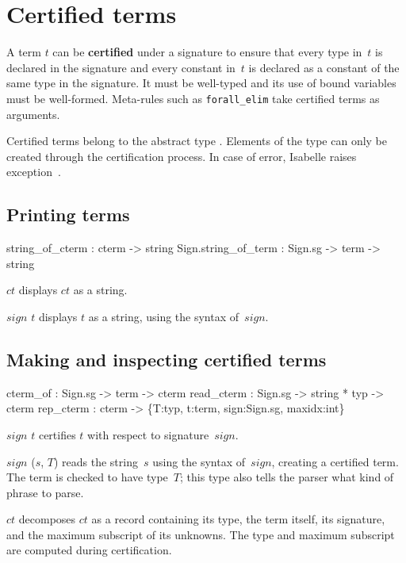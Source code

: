 \section{Certified terms} 
A term $t$ can be {\bf certified} under a signature to ensure that every
type in~$t$ is declared in the signature and every constant in~$t$ is
declared as a constant of the same type in the signature.  It must be
well-typed and its use of bound variables must be well-formed.  Meta-rules
such as {\tt forall_elim} take certified terms as arguments.

Certified terms belong to the abstract type .
Elements of the type can only be created through the certification process.
In case of error, Isabelle raises exception~\@.

\subsection{Printing terms}
\begin{ttbox} 
     string_of_cterm :           cterm -> string
Sign.string_of_term  : Sign.sg -> term -> string
\end{ttbox}
\begin{ttdescription}
\item[\ttindexbold{string_of_cterm} $ct$] 
displays $ct$ as a string.

\item[\ttindexbold{Sign.string_of_term} $sign$ $t$] 
displays $t$ as a string, using the syntax of~$sign$.
\end{ttdescription}

\subsection{Making and inspecting certified terms}
\begin{ttbox} 
cterm_of   : Sign.sg -> term -> cterm
read_cterm : Sign.sg -> string * typ -> cterm
rep_cterm  : cterm -> \{T:typ, t:term, sign:Sign.sg, maxidx:int\}
\end{ttbox}
\begin{ttdescription}
\item[\ttindexbold{cterm_of} $sign$ $t$] 
certifies $t$ with respect to signature~$sign$.

\item[\ttindexbold{read_cterm} $sign$ ($s$, $T$)] 
reads the string~$s$ using the syntax of~$sign$, creating a certified term.
The term is checked to have type~$T$; this type also tells the parser what
kind of phrase to parse.

\item[\ttindexbold{rep_cterm} $ct$] 
decomposes $ct$ as a record containing its type, the term itself, its
signature, and the maximum subscript of its unknowns.  The type and maximum
subscript are computed during certification.
\end{ttdescription}


